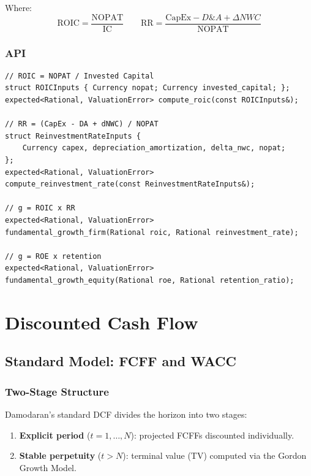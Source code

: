 \documentclass[12pt, a4paper, oneside]{book}
\newcommand{\NOPAT}{\ensuremath{\mathrm{NOPAT}}}
\newcommand{\ROIC}{\ensuremath{\mathrm{ROIC}}}
\newcommand{\IC}{\ensuremath{\mathrm{IC}}}
\newcommand{\RR}{\mathrm{RR}}
\begin{document}
Where:
\[
  \ROIC = \frac{\NOPAT}{\IC} \qquad
  \RR   = \frac{\text{CapEx} - D\&A + \Delta NWC}{\NOPAT}
\]

\subsection{API}

\begin{lstlisting}[style=cpp]
// ROIC = NOPAT / Invested Capital
struct ROICInputs { Currency nopat; Currency invested_capital; };
expected<Rational, ValuationError> compute_roic(const ROICInputs&);

// RR = (CapEx - DA + dNWC) / NOPAT
struct ReinvestmentRateInputs {
    Currency capex, depreciation_amortization, delta_nwc, nopat;
};
expected<Rational, ValuationError>
compute_reinvestment_rate(const ReinvestmentRateInputs&);

// g = ROIC x RR
expected<Rational, ValuationError>
fundamental_growth_firm(Rational roic, Rational reinvestment_rate);

// g = ROE x retention
expected<Rational, ValuationError>
fundamental_growth_equity(Rational roe, Rational retention_ratio);
\end{lstlisting}

\chapter{Discounted Cash Flow}

\section{Standard Model: FCFF and WACC}

\subsection{Two-Stage Structure}

Damodaran's standard DCF divides the horizon into two stages:

\begin{enumerate}
  \item \textbf{Explicit period} ($t = 1, \ldots, N$):
        projected FCFFs discounted individually.
  \item \textbf{Stable perpetuity} ($t > N$):
        terminal value (TV) computed via the Gordon Growth Model.
\end{enumerate}
\end{document}
